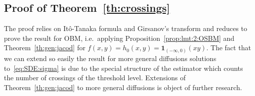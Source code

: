 \documentclass[12pt]{article}
\numberwithin{equation}{section}
\theoremstyle{definition}
\theoremstyle{remark}
\newcommand{\ind}[1]{\mathbf{1}_{#1}}
\begin{document}
\subsection{Proof of Theorem~\ref{th:crossings}}

The proof relies on It\^o-Tanaka formula and Girsanov's transform and reduces to prove the result for OBM, i.e.~applying Proposition~\ref{prop:lmt:2:OSBM} and Theorem~\ref{th:gen:jacod} for $f(x,y)=h_0(x,y)= \ind{(-\infty,0)}(x y)$.
%
The fact that we can extend so easily the result for more general diffusions solutions to~\eqref{eq:SDE:sigma} is due to the special structure of the estimator which counts the number of crossings of the threshold level.
%
Extensions of Theorem~\ref{th:gen:jacod} to more general diffusions is object of further research.
\end{document}
